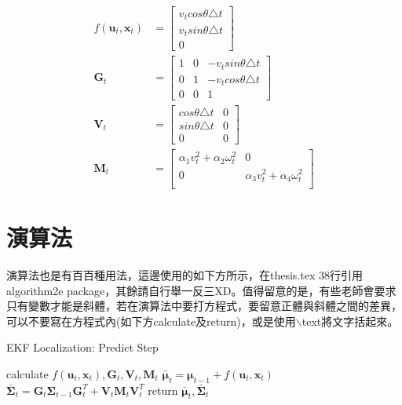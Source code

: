 \begin{align}
    \label{eqn:predict_mu_tf_zero}
	f(\boldsymbol{u}_{t},\boldsymbol{x}_{t}) &=
    \begin{bmatrix}
        v_{t}cos\theta\triangle t\\ 
        v_{t}sin\theta\triangle t\\ 
        0    \end{bmatrix}\\
    \label{eqn:predict_G_mat_zero}
    \boldsymbol{G}_t &= \begin{bmatrix}
    1 & 0 & -v_{t}sin\theta\triangle t\\
    0 & 1 & -v_{t}cos\theta\triangle t\\
    0 & 0 & 1 \end{bmatrix}\\
    \label{eqn:predict_V_mat_zero}
    \boldsymbol{V}_t &= \begin{bmatrix}
    cos\theta\triangle t & 0 \\    
    sin\theta\triangle t & 0 \\
    0 & 0 \end{bmatrix}\\
    \label{eqn:motion_noise_zero}
    \boldsymbol{M}_t &= \begin{bmatrix}
    \alpha_1 v_t^2 + \alpha_2\omega_t^2 & 0\\
    0 & \alpha_3 v_t^2 + \alpha_4\omega_t^2\\
    \end{bmatrix}
\end{align}

\section{演算法}
\label{sec:algorithm}

演算法也是有百百種用法，這邊使用的如下方所示，在thesis.tex 38行引用algorithm2e package，其餘請自行舉一反三XD。值得留意的是，有些老師會要求只有變數才能是斜體，若在演算法中要打方程式，要留意正體與斜體之間的差異，可以不要寫在方程式內(如下方calculate及return)，或是使用$\backslash$text{}將文字括起來。

\begin{algorithm}[htbp]
\caption{EKF Localization: Predict Step}
\label{algo:ekf_predict}
\BlankLine
calculate $f(\boldsymbol{u}_{t},\boldsymbol{x}_{t}), \boldsymbol{G}_t, \boldsymbol{V}_t, \boldsymbol{M}_t$\;
$\boldsymbol{\bar{\mu}}_t = \boldsymbol{\mu}_{t-1} + f(\boldsymbol{u}_{t},\boldsymbol{x}_{t})$\;
$\boldsymbol{\bar{\Sigma}}_t = \boldsymbol{G}_t \boldsymbol{\Sigma}_{t-1} \boldsymbol{G}_t^T + \boldsymbol{V}_t \boldsymbol{M}_t \boldsymbol{V}_t^T$\;
return $\boldsymbol{\bar{\mu}}_t, \boldsymbol{\bar{\Sigma}}_t$
\end{algorithm}

